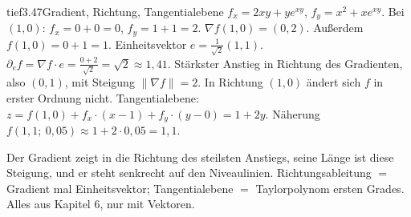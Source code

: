 \begin{loesungkarte}{tief}{3.47}{Gradient, Richtung, Tangentialebene}
$f_x = 2xy + ye^{xy}$, $f_y = x^{2} + xe^{xy}$. Bei $(1, 0)$: $f_x = 0 + 0 = 0$, $f_y = 1 + 1 = 2$. $\nabla f(1, 0) = (0, 2)$. Außerdem $f(1, 0) = 0 + 1 = 1$.
Einheitsvektor $e = \frac1{\sqrt2}(1, 1)$. $\partial_ef = \nabla f\cdot e = \frac{0 + 2}{\sqrt2} = \sqrt2\approx1{,}41$. Stärkster Anstieg in Richtung des Gradienten, also $(0, 1)$, mit Steigung $\|\nabla f\| = 2$. In Richtung $(1, 0)$ ändert sich $f$ in erster Ordnung nicht.
Tangentialebene: $z = f(1, 0) + f_x\cdot(x - 1) + f_y\cdot(y - 0) = 1 + 2y$. Näherung $f(1{,}1;\ 0{,}05)\approx1 + 2\cdot0{,}05 = 1{,}1$.
\begin{mitnehmen}\kastentext
Der Gradient zeigt in die Richtung des steilsten Anstiegs, seine Länge ist diese Steigung, und er steht senkrecht auf den Niveaulinien. Richtungsableitung $=$ Gradient mal Einheitsvektor; Tangentialebene $=$ Taylorpolynom ersten Grades. Alles aus Kapitel 6, nur mit Vektoren.
\end{mitnehmen}
\end{loesungkarte}

